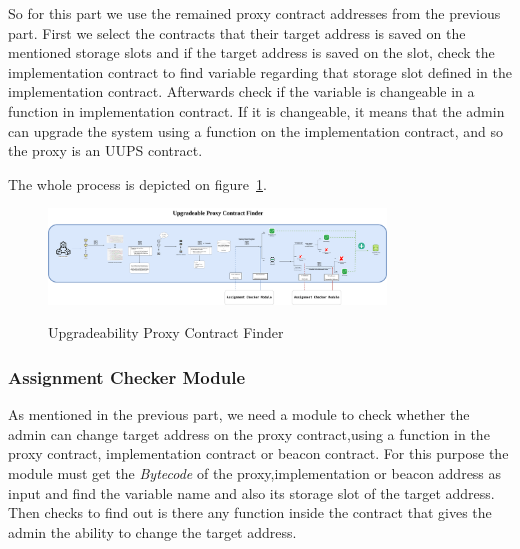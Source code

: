 So for this part we use the remained proxy contract addresses from the previous part. First we select the contracts that their target address is saved on the mentioned storage slots and if the target address is saved on the slot, check the implementation contract to find variable regarding that storage slot defined in the implementation contract. Afterwards check if the variable is changeable in a function in implementation contract. If it is changeable, it means that the admin can upgrade the system using a function on the implementation contract, and so the proxy is an UUPS contract. 

The whole process is depicted on figure~\ref{fig:finderModule}.

\begin{figure}[t!]
  \includegraphics[width=0.8\textwidth]{figures/Upgradeability_finder1.png}\label{fig:finderModule}
  \caption{Upgradeability Proxy Contract Finder}
\end{figure}

\subsubsection{Assignment Checker Module}

As mentioned in the previous part, we need a module to check whether the admin can change target address on the proxy contract,using a function in the proxy contract, implementation contract or beacon contract. For this purpose the module must get the \textit{Bytecode} of the proxy,implementation or beacon address as input and find the variable name and also its storage slot of the target address. Then checks to find out is there any function inside the contract that gives the admin the ability to change the target address.

